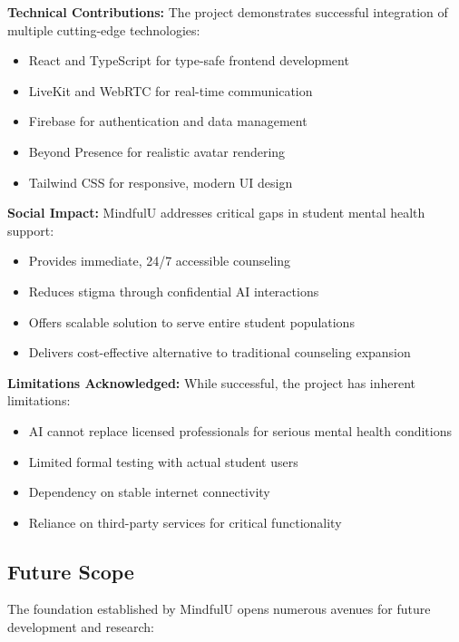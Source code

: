 \documentclass[11pt,a4paper]{article}
\begin{document}
\textbf{Technical Contributions:}
The project demonstrates successful integration of multiple cutting-edge technologies:
\begin{itemize}
    \item React and TypeScript for type-safe frontend development
    \item LiveKit and WebRTC for real-time communication
    \item Firebase for authentication and data management
    \item Beyond Presence for realistic avatar rendering
    \item Tailwind CSS for responsive, modern UI design
\end{itemize}

\textbf{Social Impact:}
MindfulU addresses critical gaps in student mental health support:
\begin{itemize}
    \item Provides immediate, 24/7 accessible counseling
    \item Reduces stigma through confidential AI interactions
    \item Offers scalable solution to serve entire student populations
    \item Delivers cost-effective alternative to traditional counseling expansion
\end{itemize}

\textbf{Limitations Acknowledged:}
While successful, the project has inherent limitations:
\begin{itemize}
    \item AI cannot replace licensed professionals for serious mental health conditions
    \item Limited formal testing with actual student users
    \item Dependency on stable internet connectivity
    \item Reliance on third-party services for critical functionality
\end{itemize}

\subsection{Future Scope}

The foundation established by MindfulU opens numerous avenues for future development and research:
\end{document}
